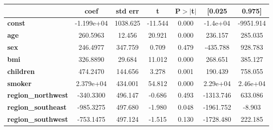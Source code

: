 \begin{center}
\begin{tabular}{lcccccc}
\toprule
                           & \textbf{coef} & \textbf{std err} & \textbf{t} & \textbf{P$> |$t$|$} & \textbf{[0.025} & \textbf{0.975]}  \\
\midrule
\textbf{const}             &   -1.199e+04  &     1038.625     &   -11.544  &         0.000        &     -1.4e+04    &    -9951.914     \\
\textbf{age}               &     260.5963  &       12.456     &    20.921  &         0.000        &      236.157    &      285.035     \\
\textbf{sex}               &     246.4977  &      347.759     &     0.709  &         0.479        &     -435.788    &      928.783     \\
\textbf{bmi}               &     326.8890  &       29.684     &    11.012  &         0.000        &      268.651    &      385.127     \\
\textbf{children}          &     474.2470  &      144.656     &     3.278  &         0.001        &      190.439    &      758.055     \\
\textbf{smoker}            &    2.379e+04  &      434.001     &    54.812  &         0.000        &     2.29e+04    &     2.46e+04     \\
\textbf{region\_northwest} &    -340.3300  &      496.147     &    -0.686  &         0.493        &    -1313.746    &      633.086     \\
\textbf{region\_southeast} &    -985.3275  &      497.680     &    -1.980  &         0.048        &    -1961.752    &       -8.903     \\
\textbf{region\_southwest} &    -753.1475  &      497.124     &    -1.515  &         0.130        &    -1728.480    &      222.185     \\
\bottomrule
\end{tabular}
\end{center}